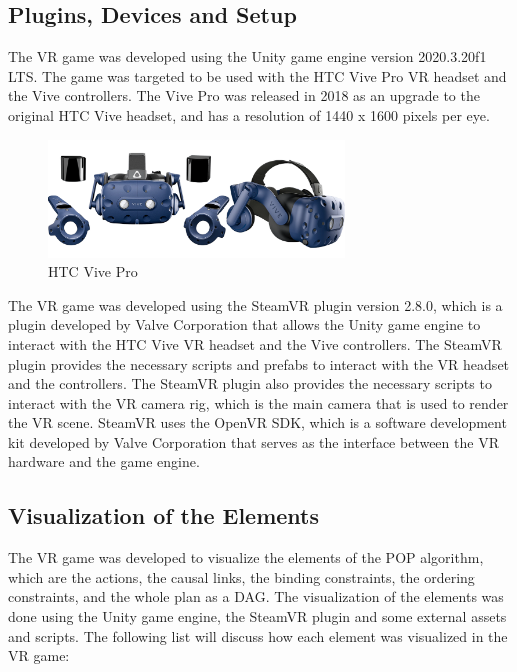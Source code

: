 \subsection{Plugins, Devices and Setup} \label{subsec:plugins_devices_setup}
The \ac{VR} game was developed using the Unity game engine version 2020.3.20f1 \ac{LTS}. The game was targeted to be used with the HTC Vive Pro \ac{VR} headset and the Vive controllers. The Vive Pro was released in 2018 as an upgrade to the original HTC Vive headset, and has a resolution of 1440 x 1600 pixels per eye\cite{WikiHTCVive}.

\begin{figure}[H]
    \centering
    \includegraphics[width=0.7\textwidth]{images/htc_vive_pro_full.PNG}
    \caption[HTC Vive Pro]{HTC Vive Pro \cite{ViveProFullKit}}
    \label{fig:htc_vive_pro}
\end{figure}

The \ac{VR} game was developed using the SteamVR plugin version 2.8.0, which is a plugin developed by Valve Corporation that allows the Unity game engine to interact with the HTC Vive \ac{VR} headset and the Vive controllers. The SteamVR plugin provides the necessary scripts and prefabs to interact with the \ac{VR} headset and the controllers. The SteamVR plugin also provides the necessary scripts to interact with the \ac{VR} camera rig, which is the main camera that is used to render the \ac{VR} scene. SteamVR uses the OpenVR SDK, which is a software development kit developed by Valve Corporation that serves as the interface between the \ac{VR} hardware and the game engine\cite{WikiOpenVR}.


\subsection{Visualization of the Elements} \label{subsec:visualization_elements}

The \ac{VR} game was developed to visualize the elements of the \ac{POP} algorithm, which are the actions, the causal links, the binding constraints, the ordering constraints, and the whole plan as a \acf{DAG}. The visualization of the elements was done using the Unity game engine, the SteamVR plugin and some external assets and scripts. The following list will discuss how each element was visualized in the \ac{VR} game:

